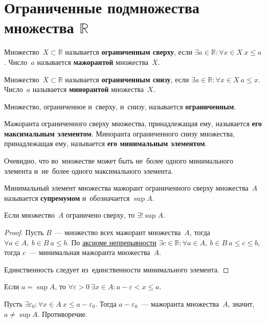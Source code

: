 \section{Ограниченные подмножества множества \texorpdfstring{$\mathbb R$}{}}
\hypertarget{def:bounded_set}{}\hypertarget{def:majorant}{} Множество~$X \subset \mathbb R$ называется \textbf{ограниченным сверху}, если $\exists a \in \mathbb R \colon \forall x \in X \ x \leqslant a$.
Число~$a$ называется \textbf{мажорантой} множества~$X$.

\hypertarget{def:minorant}{} Множество~$X \subset \mathbb R$ называется \textbf{ограниченным снизу}, если $\exists a \in \mathbb R \colon \forall x \in X \ a \leqslant x$.
Число~$a$ называется \textbf{минорантой} множества~$X$.

Множество, ограниченное и~сверху, и~снизу, называется \textbf{ограниченным}.

Мажоранта ограниченного сверху множества, принадлежащая ему, называется \textbf{его максимальным элементом}.
Миноранта ограниченного снизу множества, принадлежащая ему, называется \textbf{его минимальным элементом}.

Очевидно, что во~множестве может быть не~более одного минимального элемента и~не~более одного максимального элемента.

\hypertarget{def:supremum}{} Минимальный элемент множества мажорант ограниченного сверху множества~$A$ называется \textbf{супремумом} и~обозначается $\sup A$.

\begin{statement}
\label{st:single_supremum}
Если множество~$A$ ограничено сверху, то $\exists! \sup A$.
\end{statement}
\begin{proof}
Пусть $B$~--- множество всех мажорант множества~$A$, тогда $\forall a \in A, \ b \in B \ a \leqslant b$.
По \hyperlink{eq:continuity_axiom}{аксиоме непрерывности} $\exists c \in \mathbb R \colon \forall a \in A, \ b \in B \ a \leqslant c \leqslant b$, тогда $c$~--- минимальная мажоранта множества~$A$.

Единственность следует из~единственности минимального элемента.
\end{proof}

\begin{statement}
\label{st:inequality_of_supremum}
Если $a = \sup A$, то $\forall \varepsilon > 0 \ \exists x \in A \colon a - \varepsilon < x \leqslant a$.
\end{statement}
\begin{proofcontra}
Пусть $\exists \varepsilon_0 \colon \forall x \in A \ x \leqslant a - \varepsilon_0$.
Тогда $a - \varepsilon_0$~--- мажоранта множества~$A$, значит, $a \neq \sup A$.
Противоречие.
\end{proofcontra}

